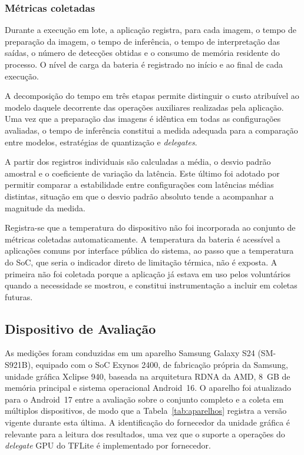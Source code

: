 \documentclass[artigo,times,capa]{iftex2024}
\begin{document}
\subsubsection{Métricas coletadas}
 
Durante a execução em lote, a aplicação registra, para cada imagem, o tempo de
preparação da imagem, o tempo de inferência, o tempo de interpretação das
saídas, o número de detecções obtidas e o consumo de memória residente do
processo. O nível de carga da bateria é registrado no início e ao final de cada
execução.
 
A decomposição do tempo em três etapas permite distinguir o custo atribuível ao
modelo daquele decorrente das operações auxiliares realizadas pela aplicação.
Uma vez que a preparação das imagens é idêntica em todas as configurações
avaliadas, o tempo de inferência constitui a medida adequada para a comparação
entre modelos, estratégias de quantização e \textit{delegates}.
 
A partir dos registros individuais são calculadas a média, o desvio padrão
amostral e o coeficiente de variação da latência. Este último foi adotado por
permitir comparar a estabilidade entre configurações com latências médias
distintas, situação em que o desvio padrão absoluto tende a acompanhar a
magnitude da medida.
 
Registra-se que a temperatura do dispositivo não foi incorporada ao
conjunto de métricas coletadas automaticamente. A temperatura da bateria é
acessível a aplicações comuns por interface pública do sistema, ao passo que a
temperatura do \ac{SoC}, que seria o indicador direto de limitação térmica,
não é exposta. A primeira não foi coletada porque a aplicação já estava em uso
pelos voluntários quando a necessidade se mostrou, e constitui instrumentação
a incluir em coletas futuras.
 
\subsection{Dispositivo de Avaliação}
\label{sec:dispositivo}
 
As medições foram conduzidas em um aparelho Samsung Galaxy S24
(SM-S921B), equipado com o \ac{SoC} Exynos 2400, de fabricação
própria da Samsung, unidade gráfica Xclipse 940, baseada na
arquitetura RDNA da AMD, 8~GB de memória principal e sistema operacional Android~16. O aparelho foi atualizado para o
Android~17 entre a avaliação sobre o conjunto completo e a coleta em múltiplos
dispositivos, de modo que a Tabela~\ref{tab:aparelhos} registra a versão
vigente durante esta última. A identificação do fornecedor da unidade
gráfica é relevante para a leitura dos resultados, uma vez que o
suporte a operações do \textit{delegate} \ac{GPU} do \ac{TFLite}
é implementado por fornecedor.
 
\end{document}
